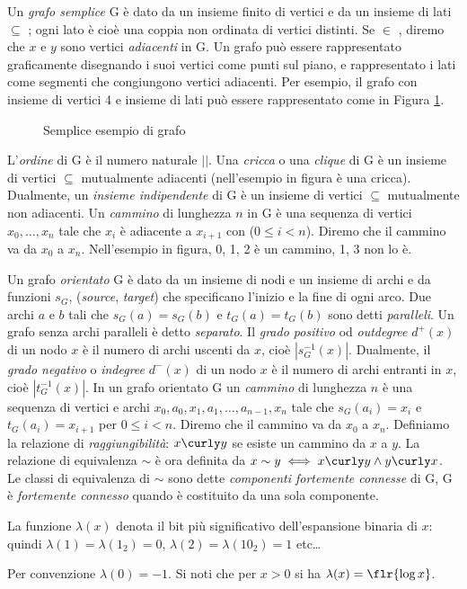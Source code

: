 Un \textit{grafo semplice} G è dato da un insieme finito di vertici  e da un insieme di lati  $\subseteq$ ; ogni lato è cioè una coppia non ordinata di vertici distinti. Se  $\in$ , diremo che $x$ e $y$ sono vertici \textit{adiacenti} in G. Un grafo può essere rappresentato graficamente disegnando i suoi vertici come punti sul piano, e rappresentato i lati come segmenti che congiungono vertici adiacenti. Per esempio, il grafo con insieme di vertici 4 e insieme di lati  può essere rappresentato come in Figura \ref{fig:simple-graph}.
\begin{figure}[h]
    \centering
    
    \caption{Semplice esempio di grafo}
    \label{fig:simple-graph}
\end{figure}
L'\textit{ordine} di G è il numero naturale $|$$|$. Una \textit{cricca} o una \textit{clique} di G è un insieme di vertici  $\subseteq$  mutualmente adiacenti (nell'esempio in figura  è una cricca). Dualmente, un \textit{insieme indipendente} di G è un insieme di vertici  $\subseteq$  mutualmente non adiacenti. Un \textit{cammino} di lunghezza $n$ in G è una sequenza di vertici $x_0, \dots, x_{n}$ tale che $x_i$ è adiacente a $x_{i + 1}$ con ($0 \leq i < n$). Diremo che il cammino va da $x_0$ a $x_{n}$. Nell'esempio in figura, 0, 1, 2 è un cammino, 1, 3 non lo è.

Un grafo \textit{orientato} G è dato da un insieme di nodi  e un insieme di archi  e da funzioni $s_G$,  (\textit{source}, \textit{target}) che specificano l'inizio e la fine di ogni arco. Due archi $a$ e $b$ tali che $s_G(a) = s_G(b)$ e $t_G(a) = t_G(b)$ sono detti \textit{paralleli}. Un grafo senza archi paralleli è detto \textit{separato}. Il \textit{grado positivo} od \textit{outdegree} $d^+(x)$ di un nodo $x$ è il numero di archi uscenti da $x$, cioè $|s_G^{-1}(x)|$. Dualmente, il \textit{grado negativo} o \textit{indegree} $d^-(x)$ di un nodo $x$ è il numero di archi entranti in $x$, cioè $|t_G^{-1}(x)|$. In un grafo orientato G un \textit{cammino} di lunghezza $n$ è una sequenza di vertici e archi $x_0, a_0, x_1, a_1, \dots, a_{n - 1}, x_n$ tale che $s_G(a_i) = x_i$ e $t_G(a_i) = x_{i + 1}$ per $0 \leq i < n$. Diremo che il cammino va da $x_0$ a $x_n$.
Definiamo la relazione di \textit{raggiungibilità}: $x \curly y$ se esiste un cammino da $x$ a $y$. La relazione di equivalenza $\sim$ è ora definita da $x \sim y \iff x \curly y \land y \curly x$. Le classi di equivalenza di $\sim$ sono dette \textit{componenti fortemente connesse} di G, G è \textit{fortemente connesso} quando è costituito da una sola componente.

La funzione $\lambda(x)$ denota il bit più significativo dell'espansione binaria di $x$: quindi $\lambda(1) = \lambda(1_2) = 0$, $\lambda(2) = \lambda(10_2) = 1$ etc\dots

Per convenzione $\lambda(0) = -1$. Si noti che per $x > 0$ si ha $\lambda(x) = \flr{\log{x}}$.
